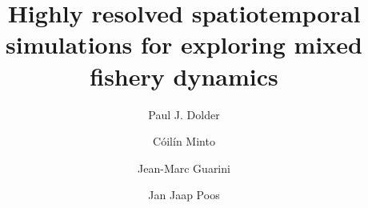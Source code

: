 \documentclass[review]{elsarticle}
\begin{document}
\begin{frontmatter}
\title{Highly resolved spatiotemporal simulations for
	exploring mixed fishery dynamics}

\author[1,2]{Paul J. Dolder}

\author[1]{Cóilín Minto}
\author[3]{Jean-Marc Guarini}
\author[4,5]{Jan Jaap Poos}

\address[1]{Marine and Freshwater Research Centre, Galway-Mayo Institute of Technology (GMIT), Dublin Road, Galway,
	Ireland} 
\address[2]{Centre for Environment, Fisheries and Aquaculture Science (Cefas),
	Pakefield Road, Lowestoft, UK}
\address[3]{Sorbonne Université, Faculty of Sciences, 4 Place Jussieu, 75005
	Paris, France}
\address[4]{Wageningen Marine Research, Haringkade 1 1976 CP IJmuiden,
	Netherlands}
\address[5]{Aquaculture and Fisheries Group, Wageningen University \& Research,
	Zodiac Building 122, De Elst 1, 6708 WD Wageningen, the Netherlands}

\begin{abstract}


\end{abstract}
\end{frontmatter}
\end{document}
